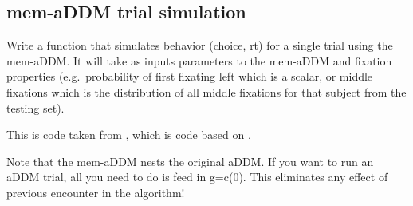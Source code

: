 \documentclass[
]{book}
\begin{document}
\hypertarget{mem-addm-trial-simulation}{%
\subsection{mem-aDDM trial simulation}\label{mem-addm-trial-simulation}}

Write a function that simulates behavior (choice, rt) for a single trial using the mem-aDDM. It will take as inputs parameters to the mem-aDDM and fixation properties (e.g.~probability of first fixating left which is a scalar, or middle fixations which is the distribution of all middle fixations for that subject from the testing set).

This is code taken from \citep{eum2022}, which is code based on \citep{lombardi2021}.

Note that the mem-aDDM nests the original aDDM. If you want to run an aDDM trial, all you need to do is feed in g=c(0). This eliminates any effect of previous encounter in the algorithm!
\end{document}
